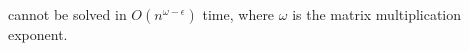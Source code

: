 \begin{frame}{}
	\begin{description}
		\centering
		\item[$\rc \sqsubseteq \mathcal{I} \sqsubseteq \tcc$:]
	\end{description}

	\pause
	\vspace{0.30cm}
	\vspace{-0.30cm}
	\begin{theorem}[Complexity]
		 cannot be solved in $O(n^{\omega - \epsilon})$
		time, where $\omega$ is the matrix multiplication exponent.
	\end{theorem}
\end{frame}

